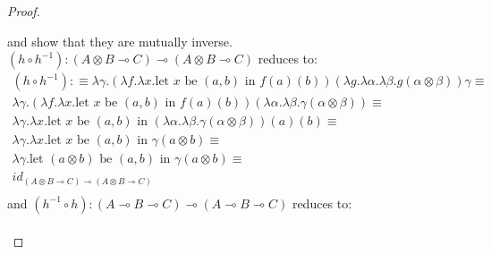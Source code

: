 \begin{thm}
\begin{proof}
\begin{enumerate}
        \begin{prooftree}
        \end{prooftree}
        and show that they are mutually inverse.
        $(h \circ h^{-1}) : (A \otimes B \multimap C) \multimap (A \otimes B \multimap C)$ reduces to:
        \[
          \begin{split}
            (h \circ h^{-1}) : \equiv \lambda \gamma. (\lambda f. \lambda x . \text{let $x$ be $(a, b)$ in $f(a)(b)$})( \lambda g. \lambda \alpha. \lambda \beta. g(\alpha \otimes \beta)) \gamma \equiv\\
            \lambda \gamma. (\lambda f. \lambda x . \text{let $x$ be $(a, b)$ in $f(a)(b)$}) (\lambda \alpha. \lambda \beta. \gamma(\alpha \otimes \beta)) \equiv \\
            \lambda \gamma. \lambda x . \text{let $x$ be $(a, b)$ in $(\lambda \alpha. \lambda \beta. \gamma(\alpha \otimes \beta))(a)(b)$}  \equiv \\
            \lambda \gamma. \lambda x . \text{let $x$ be $(a, b)$ in $\gamma(a \otimes b)$}  \equiv \\
            \lambda \gamma. \text{let $(a \otimes b)$ be $(a, b)$ in $\gamma(a \otimes b)$}  \equiv \\
            id_{(A \otimes B \multimap C) \multimap (A \otimes B \multimap C)}\\
          \end{split}          
        \]
        and $(h^{-1} \circ h) : (A \multimap B \multimap C) \multimap (A \multimap B \multimap C)$ reduces to:
      \[
        \begin{split}

\end{split}\]
\end{enumerate}
\end{proof}
\end{thm}
